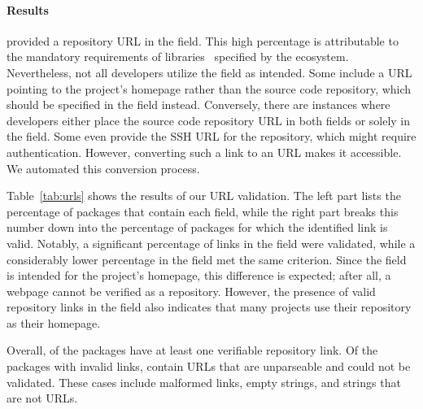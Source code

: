 \documentclass[smallextended]{svjour3}
\newcommand{\tabref}[1]{Table~\ref{tab:#1}}
\newcommand{\maven}[1]{\tool{Maven{#1}}}
\begin{document}
\paragraph{Results}
 provided a repository URL in the  field. This high percentage is attributable to the mandatory requirements of \maven{} libraries~\cite{maven-requirements} specified by the ecosystem. Nevertheless, not all developers utilize the  field as intended. Some include a URL pointing to the project's homepage rather than the source code repository, which should be specified in the  field instead. Conversely, there are instances where developers either place the source code repository URL in both fields or solely in the  field. Some even provide the SSH URL for the repository, which might require authentication. However, converting such a link to an  URL makes it accessible. We automated this conversion process.

\tabref{urls} shows the results of our URL validation. The left part lists the percentage of packages that contain each field, while the right part breaks this number down into the percentage of packages for which the identified link is valid.
Notably, a significant percentage  of links in the  field were validated, while a considerably lower percentage  in the  field met the same criterion. Since the  field is intended for the project's homepage, this difference is expected; after all, a webpage cannot be verified as a repository. However, the presence of  valid repository links in the  field also indicates that many projects use their repository as their homepage.

Overall,  of the packages have at least one verifiable repository link. Of the packages with invalid links,  contain URLs that are unparseable and could not be validated. These cases include malformed links, empty strings, and strings that are not URLs.
\end{document}
